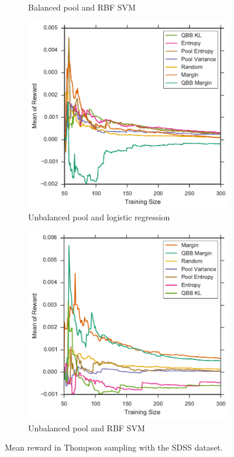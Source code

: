 \begin{figure}[p]
\begin{subfigure}{.5\textwidth}
		\caption{Balanced pool and RBF SVM}
		\label{fig:sdss_br_avg_rewards}
	\end{subfigure}
	\begin{subfigure}{.5\textwidth}
		\centering
		\includegraphics[width=\textwidth]{figures/5_thompson/sdss_ul_avg_rewards}
		\caption{Unbalanced pool and logistic regression}
		\label{fig:sdss_ul_avg_rewards}
	\end{subfigure}%
	\begin{subfigure}{.5\textwidth}
		\centering
		\includegraphics[width=\linewidth]{figures/5_thompson/sdss_ur_avg_rewards}
		\caption{Unbalanced pool and RBF SVM}
		\label{fig:sdss_ur_avg_rewards}
	\end{subfigure}
	\caption[Mean reward of heuristics (SDSS)]{
		Mean reward in Thompson sampling with the SDSS dataset.}
	\label{fig:sdss_avg_rewards}
\end{figure}


